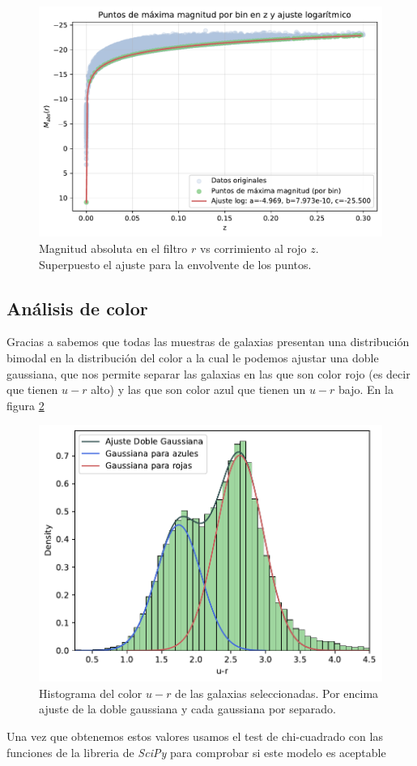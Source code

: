 \documentclass[twocolumn]{article}
\begin{document}
\begin{figure}[t]
\includegraphics[width=\linewidth]{mabs_vs_z_ajuste_log_max.pdf}
\caption{Magnitud absoluta en el filtro $r$ vs corrimiento al rojo $z$. Superpuesto el ajuste para la envolvente de los puntos.}
\label{fig:mabs_log}
\end{figure}



\subsection{Análisis de color}
Gracias a \citet{2004Bimodalidad} sabemos que todas las muestras de galaxias presentan una distribución bimodal en la distribución del color a la cual le podemos ajustar una doble gaussiana, que nos permite separar las galaxias en las que son color rojo (es decir que tienen $u-r$ alto) y las que son color azul que tienen un $u-r$ bajo. 
En la figura \ref{fig:ur}
\begin{figure}[t]
\includegraphics[width=\linewidth]{ur.pdf}
\caption{Histograma del color $u-r$ de las galaxias seleccionadas. Por encima ajuste de la doble gaussiana y cada gaussiana por separado.}
\label{fig:ur}
\end{figure}
Una vez que obtenemos estos valores usamos el test de chi-cuadrado con las funciones de la libreria de \textit{SciPy} \citep{SciPy} para comprobar si este modelo es aceptable
\end{document}

